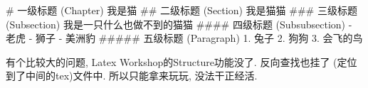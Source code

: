 \documentclass[UTF8]{report}
\begin{document}
\begin{markdown}
# 一级标题 (Chapter)
我是猫
## 二级标题 (Section)
我是猫猫
### 三级标题 (Subsection)
我是一只什么也做不到的猫猫
#### 四级标题 (Subsubsection)
- 老虎
- 狮子
- 美洲豹
##### 五级标题 (Paragraph)
1. 兔子
2. 狗狗
3. 会飞的鸟

有个比较大的问题, Latex Workshop的Structure功能没了. 反向查找也挂了 (定位到了中间的tex)文件中. 
所以只能拿来玩玩, 没法干正经活. 
\end{markdown}
\end{document}
